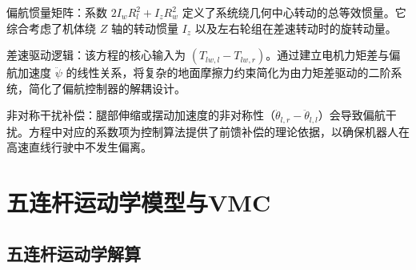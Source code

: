 偏航惯量矩阵：系数 $2I_w R_{l}^{2} + I_z R_{w}^{2}$ 定义了系统绕几何中心转动的总等效惯量。它综合考虑了机体绕 $Z$ 轴的转动惯量 $I_z$ 以及左右轮组在差速转动时的旋转动量。

差速驱动逻辑：该方程的核心输入为 $(T_{lw,l} - T_{lw,r})$。通过建立电机力矩差与偏航加速度 $\ddot{\psi}$ 的线性关系，将复杂的地面摩擦力约束简化为由力矩差驱动的二阶系统，简化了偏航控制器的解耦设计。

非对称干扰补偿：腿部伸缩或摆动加速度的非对称性（$\ddot{\theta}_{l,r} - \ddot{\theta}_{l,l}$）会导致偏航干扰。方程中对应的系数项为控制算法提供了前馈补偿的理论依据，以确保机器人在高速直线行驶中不发生偏离。

\section{五连杆运动学模型与VMC}

\subsection{五连杆运动学解算}

